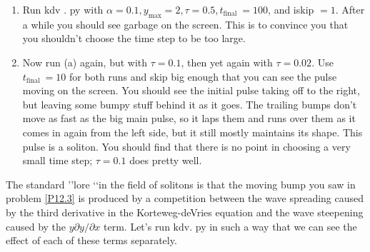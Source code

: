 \begin{problem}\label{P12.3}

\begin{enumerate}[label=(\alph*)]
\item Run kdv . py with $\alpha=0.1, y_{\max }=2, \tau=0.5, t_{\text {final }}=100$, and iskip $=1$. After a while you should see garbage on the screen. This is to convince you that you shouldn't choose the time step to be too large.
\item Now run (a) again, but with $\tau=0.1$, then yet again with $\tau=0.02$. Use $t_{\text {final }}=10$ for both runs and skip big enough that you can see the pulse moving on the screen. You should see the initial pulse taking off to the right, but leaving some bumpy stuff behind it as it goes. The trailing bumps don\rq t move as fast as the big main pulse, so it laps them and runs over them as it comes in again from the left side, but it still mostly maintains its shape. This pulse is a soliton. You should find that there is no point in choosing a very small time step; $\tau=0.1$ does pretty well.

\end{enumerate}
\end{problem}
The standard \rq\rq lore \lq\lq in the field of solitons is that the moving bump you saw in problem \ref{P12.3} is produced by a competition between the wave spreading caused by the third derivative in the Korteweg-deVries equation and the wave steepening caused by the $y \partial y / \partial x$ term. Let\rq s run $\mathrm{kdv}$. py in such a way that we can see the effect of each of these terms separately.


